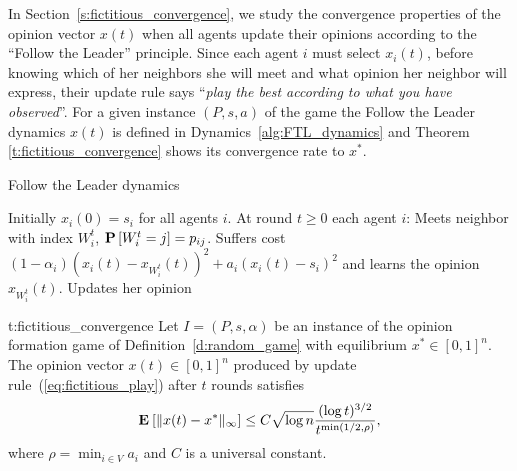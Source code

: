In Section~\ref{s:fictitious_convergence}, we study the convergence properties
of the opinion vector $x(t)$ when all agents update their opinions
according to the \enquote{Follow the Leader} principle.
Since each agent $i$ must select $x_i(t)$, before knowing which of her neighbors she
will meet and what opinion her neighbor will express, their update rule
says \enquote{\emph{play the best according to what you have observed}}.
For a given instance $(P,s,a)$ of the game %
the Follow the Leader dynamics $x(t)$ is defined in Dynamics~\ref{alg:FTL_dynamics} and
Theorem \ref{t:fictitious_convergence} shows its convergence rate to $x^*$.
%
\begin{algorithm}
  \caption{Follow the Leader dynamics}
  \label{alg:FTL_dynamics}
  \begin{algorithmic}[1]
    \STATE Initially $x_i(0) = s_i$ for all agents $i$.
    \STATE At round $t\geq 0$ each agent $i$:
    \bindent
    \STATE Meets neighbor with index $W_i^t$, $\bm{\mathrm{P}}\left[W_i^t=j\right]=p_{ij}$.
    \STATE Suffers cost \((1-\alpha_i) (x_i(t) - x_{W_i^t}(t))^2 + a_i (x_i(t) - s_i)^2\)
    and learns the opinion $x_{W_i^t}(t)$.
  \STATE Updates her opinion
    \eindent
  \end{algorithmic}
\end{algorithm}
%

%
\begin{reptheorem}{t:fictitious_convergence}
  Let $I = (P,s, \alpha)$ be an instance of the opinion formation
  game of Definition~\ref{d:random_game} with equilibrium
  $x^* \in [0,1]^n$.  The opinion vector $x(t)\in[0,1]^n$ produced by
  update rule~(\ref{eq:fictitious_play}) after $t$ rounds satisfies
  \[
    \bm{\mathrm{E}}_{} \left[ \| x(t) - x^* \|_{\infty} \right] \leq
    C \sqrt{\log n}\frac{(\log t)^{3/2}}{t^{\min(1/2,\rho)}},
  \]
  where $\rho = \min_{i \in V} a_i$ and $C$ is a universal constant.
\end{reptheorem}


